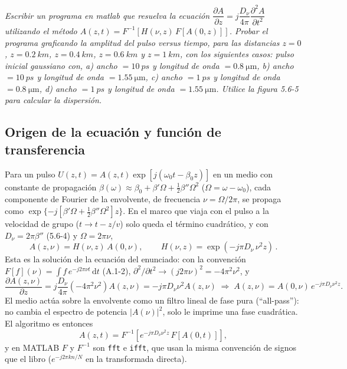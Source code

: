 \documentclass{article}
\newcommand{\dd}{\,\mathrm{d}}
\newcommand{\Dnu}{D_\nu}
\newcommand{\um}{\si{\micro\metre}}
\begin{document}
\emph{Escribir un programa en matlab que resuelva la ecuación
$\dfrac{\partial A}{\partial z}=j\dfrac{\Dnu}{4\pi}\dfrac{\partial^2A}{\partial t^2}$
utilizando el método $A(z,t)=F^{-1}\!\left[H(\nu,z)\,F[A(0,z)]\right]$. Probar el programa
graficando la amplitud del pulso versus tiempo, para las distancias $z=0$, $z=\SI{0.2}{km}$,
$z=\SI{0.4}{km}$, $z=\SI{0.6}{km}$ y $z=\SI{1}{km}$, con los siguientes casos: pulso inicial
gaussiano con, a) ancho $=\SI{10}{ps}$ y longitud de onda $=\SI{0.8}{\um}$, b) ancho $=\SI{10}{ps}$ y
longitud de onda $=\SI{1.55}{\um}$, c) ancho $=\SI{1}{ps}$ y longitud de onda $=\SI{0.8}{\um}$,
d) ancho $=\SI{1}{ps}$ y longitud de onda $=\SI{1.55}{\um}$. Utilice la figura 5.6-5 para calcular
la dispersión.}

\subsection*{Origen de la ecuación y función de transferencia}

Para un pulso $U(z,t)=A(z,t)\exp[j(\omega_0t-\beta_0z)]$ en un medio con constante de propagación
$\beta(\omega)\approx\beta_0+\beta'\Omega+\tfrac12\beta''\Omega^2$ ($\Omega=\omega-\omega_0$),
cada componente de Fourier de la envolvente, de frecuencia $\nu=\Omega/2\pi$, se propaga como
$\exp\{-j[\beta'\Omega+\tfrac12\beta''\Omega^2]z\}$. En el marco que viaja con el pulso a la
velocidad de grupo ($t\to t-z/v$) solo queda el término cuadrático, y con
$\Dnu=2\pi\beta''$ (5.6-4) y $\Omega=2\pi\nu$,
\[
A(z,\nu)=H(\nu,z)\,A(0,\nu),\qquad
\boxed{\,H(\nu,z)=\exp\!\left(-j\pi\Dnu\,\nu^2z\right)\,}.
\]
Esta es la solución de la ecuación del enunciado: con la convención
$F[f](\nu)=\int f\,e^{-j2\pi\nu t}\dd t$ (A.1-2), $\partial^2/\partial t^2\to(j2\pi\nu)^2=-4\pi^2\nu^2$, y
\[
\frac{\partial A(z,\nu)}{\partial z}=j\frac{\Dnu}{4\pi}\left(-4\pi^2\nu^2\right)A(z,\nu)
=-j\pi\Dnu\nu^2A(z,\nu)
\;\Longrightarrow\; A(z,\nu)=A(0,\nu)\,e^{-j\pi\Dnu\nu^2z}.
\]
El medio actúa sobre la envolvente como un filtro lineal de fase pura (``all-pass''): no cambia
el espectro de potencia $|A(\nu)|^2$, solo le imprime una fase cuadrática. El algoritmo es
entonces
\[
A(z,t)=F^{-1}\!\left[e^{-j\pi\Dnu\nu^2z}\,F[A(0,t)]\right],
\]
y en MATLAB $F$ y $F^{-1}$ son \texttt{fft} e \texttt{ifft}, que usan la misma convención de
signos que el libro ($e^{-j2\pi kn/N}$ en la transformada directa).
\end{document}
